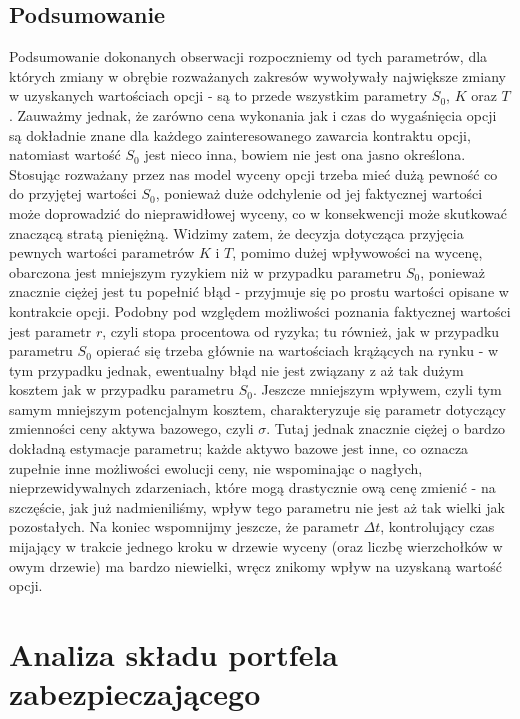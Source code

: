 \documentclass[
]{article}
\begin{document}
\hypertarget{podsumowanie}{%
\subsection{Podsumowanie}\label{podsumowanie}}

Podsumowanie dokonanych obserwacji rozpoczniemy od tych parametrów, dla
których zmiany w obrębie rozważanych zakresów wywoływały największe
zmiany w uzyskanych wartościach opcji - są to przede wszystkim parametry
\(S_0\), \(K\) oraz \(T\). Zauważmy jednak, że zarówno cena wykonania
jak i czas do wygaśnięcia opcji są dokładnie znane dla każdego
zainteresowanego zawarcia kontraktu opcji, natomiast wartość \(S_0\)
jest nieco inna, bowiem nie jest ona jasno określona. Stosując rozważany
przez nas model wyceny opcji trzeba mieć dużą pewność co do przyjętej
wartości \(S_0\), ponieważ duże odchylenie od jej faktycznej wartości
może doprowadzić do nieprawidłowej wyceny, co w konsekwencji może
skutkować znaczącą stratą pieniężną. Widzimy zatem, że decyzja dotycząca
przyjęcia pewnych wartości parametrów \(K\) i \(T\), pomimo dużej
wpływowości na wycenę, obarczona jest mniejszym ryzykiem niż w przypadku
parametru \(S_0\), ponieważ znacznie ciężej jest tu popełnić błąd -
przyjmuje się po prostu wartości opisane w kontrakcie opcji. Podobny pod
względem możliwości poznania faktycznej wartości jest parametr \(r\),
czyli stopa procentowa od ryzyka; tu również, jak w przypadku parametru
\(S_0\) opierać się trzeba głównie na wartościach krążących na rynku - w
tym przypadku jednak, ewentualny błąd nie jest związany z aż tak dużym
kosztem jak w przypadku parametru \(S_0\). Jeszcze mniejszym wpływem,
czyli tym samym mniejszym potencjalnym kosztem, charakteryzuje się
parametr dotyczący zmienności ceny aktywa bazowego, czyli \(\sigma\).
Tutaj jednak znacznie ciężej o bardzo dokładną estymacje parametru;
każde aktywo bazowe jest inne, co oznacza zupełnie inne możliwości
ewolucji ceny, nie wspominając o nagłych, nieprzewidywalnych
zdarzeniach, które mogą drastycznie ową cenę zmienić - na szczęście, jak
już nadmieniliśmy, wpływ tego parametru nie jest aż tak wielki jak
pozostałych. Na koniec wspomnijmy jeszcze, że parametr \(\Delta t\),
kontrolujący czas mijający w trakcie jednego kroku w drzewie wyceny
(oraz liczbę wierzchołków w owym drzewie) ma bardzo niewielki, wręcz
znikomy wpływ na uzyskaną wartość opcji.

\hypertarget{analiza-skux142adu-portfela-zabezpieczajux105cego}{%
\section{Analiza składu portfela
zabezpieczającego}\label{analiza-skux142adu-portfela-zabezpieczajux105cego}}
\end{document}
